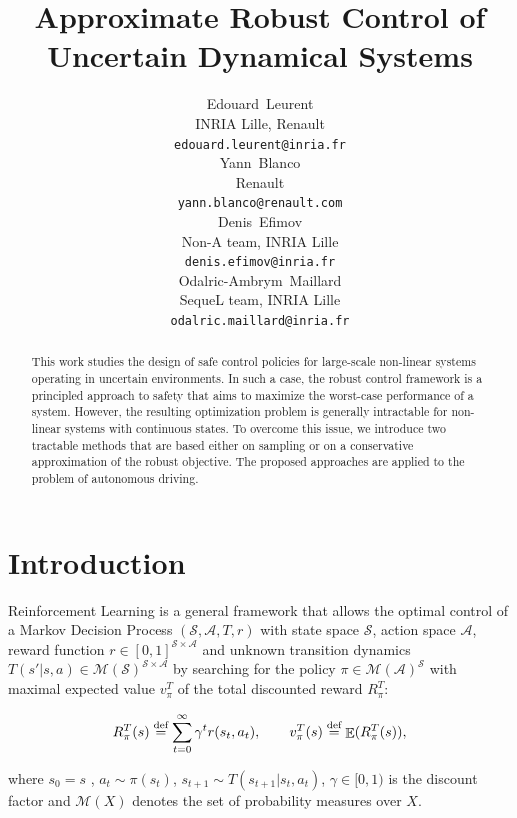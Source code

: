 \documentclass{article}
\title{Approximate Robust Control of Uncertain Dynamical Systems}
\author{
  Edouard~Leurent\\
  INRIA Lille, Renault\\
  \texttt{edouard.leurent@inria.fr} \\
  \And
  Yann~Blanco \\
   Renault \\
   \texttt{yann.blanco@renault.com} \\
   \AND
   Denis~Efimov \\
   Non-A team, INRIA Lille \\
   \texttt{denis.efimov@inria.fr} \\
   \And
   Odalric-Ambrym~Maillard \\
   SequeL team, INRIA Lille \\
   \texttt{odalric.maillard@inria.fr} \\
}
\DeclareMathOperator*{\E}{\mathbb{E}}
\newcommand{\eqdef}{\buildrel \text{def}\over =}
\begin{document}

% 


\maketitle

\begin{abstract}
This work studies the design of safe control policies for large-scale non-linear systems operating in uncertain environments. In such a case, the robust control framework is a principled approach to safety that aims to maximize the worst-case performance of a system. However, the resulting optimization problem is generally intractable for non-linear systems with continuous states. To overcome this issue, we introduce two tractable methods that are based either on sampling or on a conservative approximation of the robust objective. The proposed approaches are applied to the problem of autonomous driving.
\end{abstract}

\section{Introduction}

\vspace{-3mm}
\noindent
Reinforcement Learning is a general framework that allows the optimal control of a Markov Decision Process $(\mathcal{S}, \mathcal{A}, T, r)$ with state space $\mathcal{S}$, action space $\mathcal{A}$, reward function $r\in [0, 1]^{\mathcal{S}\times\mathcal{A}}$ and unknown transition dynamics $T(s' | s, a) \in \mathcal{M}(\mathcal{S})^{\mathcal{S}\times\mathcal{A}}$ by searching for the policy $\pi \in \mathcal{M}(\mathcal{A})^\mathcal{S}$ with maximal expected value $v_\pi^T$ of the total discounted reward $R_\pi^T$:


\vspace{-5mm}
\begin{equation}
R_\pi^T(s) \eqdef \sum_{t=0}^\infty \gamma^t r(s_t, a_t), \qquad v_\pi^T (s) \eqdef \E({R_\pi^T (s)}),
\end{equation}

\vspace{-3mm}
\noindent
where $s_0=s$ , $a_t\sim\pi(s_t)$, $s_{t+1}\sim T(s_{t+1} | s_t, a_t)$, $\gamma\in[0, 1)$ is the discount factor and $\mathcal{M}(X)$ denotes the set of probability measures over $X$.
\end{document}
